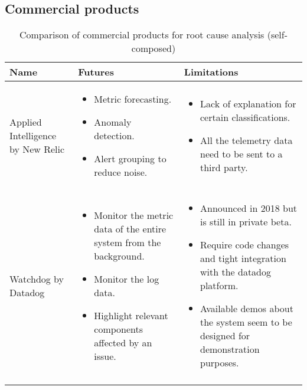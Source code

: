 \subsection{Commercial products}

\begin{longtable}{| p{40mm} | p{55mm} | p{55mm} |}
\hline
  \textbf{Name} &
  \textbf{Futures} &
  \textbf{Limitations} \\ \hline


  Applied Intelligence by New Relic &
  \vspace{-8mm}
  \begin{itemize}[leftmargin=*,noitemsep,nolistsep] 
    \item Metric forecasting.
    \item Anomaly detection.
    \item Alert grouping to reduce noise.
  \vspace{-7mm}
  \end{itemize} &
  \vspace{-8mm}
  \begin{itemize}[leftmargin=*,noitemsep,nolistsep] 
    \item Lack of explanation for certain classifications.
    \item All the telemetry data need to be sent to a third party.
  \vspace{-7mm}
  \end{itemize} \\ \hline


  Watchdog by Datadog &
  \vspace{-8mm}
  \begin{itemize}[leftmargin=*,noitemsep,nolistsep] 
    \item Monitor the metric data of the entire system from the background.
    \item Monitor the log data.
    \item Highlight relevant components affected by an issue.
  \vspace{-7mm}
  \end{itemize} &
  \vspace{-8mm}
  \begin{itemize}[leftmargin=*,noitemsep,nolistsep] 
    \item Announced in 2018 but is still in private beta.
    \item Require code changes and tight integration with the datadog platform.
    \item Available demos about the system seem to be designed for demonstration purposes.
  \vspace{-7mm}
  \end{itemize} \\ \hline


  \caption{Comparison of commercial products for root cause analysis (self-composed)}
\end{longtable}